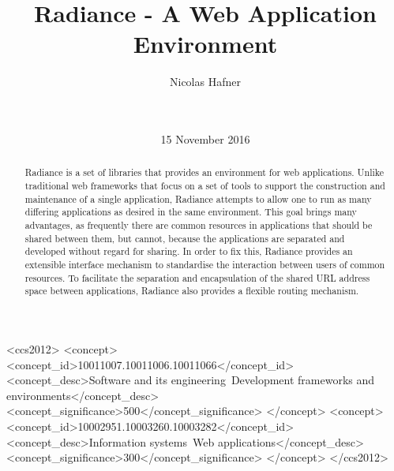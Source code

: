 \documentclass{sig-alternate}
\begin{document}
\doi{}
\isbn{}

\begin{CCSXML}
<ccs2012>
  <concept>
    <concept_id>10011007.10011006.10011066</concept_id>
    <concept_desc>Software and its engineering~Development frameworks and environments</concept_desc>
    <concept_significance>500</concept_significance>
  </concept>
  <concept>
    <concept_id>10002951.10003260.10003282</concept_id>
    <concept_desc>Information systems~Web applications</concept_desc>
    <concept_significance>300</concept_significance>
  </concept>
</ccs2012>
\end{CCSXML}


\title{Radiance - A Web Application Environment}

\author{
\alignauthor
Nicolas Hafner\\
       \\
       \\
}
\date{15 November 2016}

\maketitle

\begin{abstract}
  Radiance\cite{radiance} is a set of libraries that provides an environment for web applications. Unlike traditional web frameworks that focus on a set of tools to support the construction and maintenance of a single application, Radiance attempts to allow one to run as many differing applications as desired in the same environment. This goal brings many advantages, as frequently there are common resources in applications that should be shared between them, but cannot, because the applications are separated and developed without regard for sharing. In order to fix this, Radiance provides an extensible interface mechanism to standardise the interaction between users of common resources. To facilitate the separation and encapsulation of the shared URL address space between applications, Radiance also provides a flexible routing mechanism.
\end{abstract}

\printccsdesc
\end{document}
